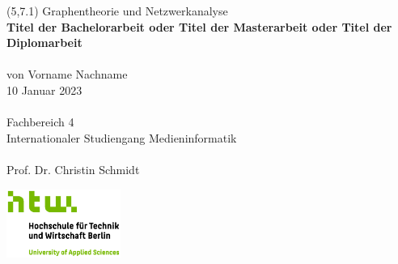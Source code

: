 \begin{titlepage}

\begingroup
\begin{textblock}{6}(5,7.1)
\setlength{\parindent}{0pt}
\fontsize{10pt}{1.1em}\selectfont
Graphentheorie und Netzwerkanalyse
\vspace{0.1cm}
\\
\LARGE
{\color{htwgreen}
\textbf{Titel der Bachelorarbeit oder Titel der Masterarbeit oder Titel der Diplomarbeit}
}\\\\
\fontsize{10pt}{1.1em}\selectfont
von Vorname Nachname\\
10 Januar 2023\\\\
Fachbereich 4\\
Internationaler Studiengang Medieninformatik\\\\
Prof. Dr. Christin Schmidt\\
\end{textblock}
\endgroup
     
\vfill
        
\begin{center}
\includegraphics[width=0.28\textwidth,keepaspectratio]{images/HTW_Logo_rgb.jpg}
\end{center}

\end{titlepage}